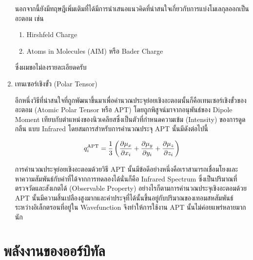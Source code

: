 \begin{enumerate}[topsep=0pt,noitemsep]
          นอกจากนี้ยังมีทฤษฎีเพิ่มเติมที่ได้มีการนำเสนอแนวคิดที่น่าสนใจเกี่ยวกับการแบ่งโมเลกุลออกเป็นอะตอม เช่น

          \begin{enumerate}[topsep=0pt,noitemsep]\setlength\itemsep{0.5em}
              \item Hirshfeld Charge\autocite{hirshfeld1977}

              \item Atoms in Molecules (AIM) หรือ Bader Charge\autocite{bader1985,bader1991}
          \end{enumerate}

          \noindent ซึ่งผมขอไม่ลงรายละเอียดครับ

    \item เทนเซอร์เชิงขั้ว (Polar Tensor)\autocite{person1974,milani2010}

          อีกหนึ่งวิธีที่น่าสนใจที่ถูกพัฒนาขึ้นมาเพื่อคำนวณประจุย่อยเชิงอะตอมนั้นก็คือเทนเซอร์เชิงขั้วของอะตอม (Atomic Polar Tensor หรือ APT)
          โดยถูกพิสูจน์มาจากอนุพันธ์ของ Dipole Moment เทียบกับตำแหน่งของนิวเคลียสซึ่งเป็นตัวที่กำหนดความเข้ม (Intensity) ของการดูดกลืน%
          แบบ Infrared โดยสมการสำหรับการคำนวณประจุ APT นั้นมีดังต่อไปนี้

          \begin{equation}\label{eq:apt_chage}
              q^{\text{APT}}_{i} = \frac{1}{3} \left( \pdv{\mu_{x}}{x_{i}} + \pdv{\mu_{y}}{y_{i}}
              + \pdv{\mu_{z}}{z_{i}} \right)
          \end{equation}

          การคำนวณประจุย่อยเชิงอะตอมด้วยวิธี APT นั้นมีข้อดีอย่างหนึ่งคือเราสามารถเชื่อมโยงและหาความสัมพันธ์กับค่าที่ได้จากการทดลองได้นั่นก็คือ
          Infrared Spectrum ซึ่งเป็นปริมาณที่ตรวจวัดและสังเกตได้ (Observable Property) อย่างไรก็ตามการคำนวณประจุเชิงอะตอมด้วย APT
          นั้นมีความสิ้นเปลืองสูงมากและค่าประจุที่ได้นั้นขึ้นอยู่กับปริมาณของเทอมสหสัมพันธ์ระหว่างอิเล็กตรอนที่อยู่ใน Wavefunction จึงทำให้การใช้งาน
          APT นั้นไม่ค่อยแพร่หลายมากนัก

\end{enumerate}

\section{พลังงานของออร์บิทัล}
\label{sec:ener_orb}


